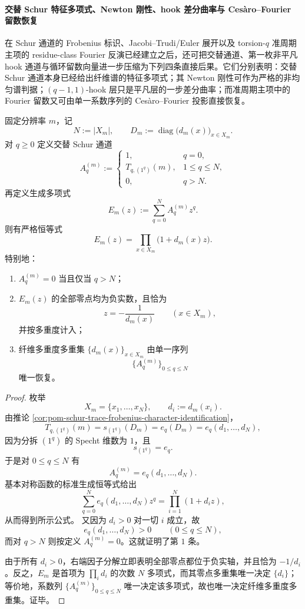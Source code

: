 \paragraph{交替 Schur 特征多项式、Newton 刚性、hook 差分曲率与 Ces\`aro--Fourier 留数恢复}
在 Schur 通道的 Frobenius 标识、Jacobi--Trudi/Euler 展开以及 torsion-\(q\) 准周期主项的 residue-class Fourier 反演已经建立之后，还可把交替通道、第一枚非平凡 hook 通道与循环留数向量进一步压缩为下列四条直接后果。它们分别表明：交替 Schur 通道本身已经给出纤维谱的特征多项式；其 Newton 刚性可作为严格的非均匀谱判据；\((q-1,1)\)-hook 层只是平凡层的一步差分曲率；而准周期主项中的 Fourier 留数又可由单一系数序列的 Ces\`aro--Fourier 投影直接恢复。

\begin{theorem}\label{thm:xi-time-part63a-alternating-schur-characteristic-polynomial}
固定分辨率 \(m\)，记
\[
N:=|X_m|,
\qquad
D_m:=\operatorname{diag}\bigl(d_m(x)\bigr)_{x\in X_m}.
\]
对 \(q\ge 0\) 定义交替 Schur 通道
\[
A_q^{(m)}:=
\begin{cases}
1, & q=0,\\[2pt]
T_{q,(1^q)}(m), & 1\le q\le N,\\[2pt]
0, & q>N.
\end{cases}
\]
再定义生成多项式
\[
E_m(z):=\sum_{q=0}^{N}A_q^{(m)}z^q.
\]
则有严格恒等式
\[
\boxed{\;
E_m(z)=\prod_{x\in X_m}\bigl(1+d_m(x)z\bigr).\;}
\]
特别地：
\begin{enumerate}
  \item \(A_q^{(m)}=0\) 当且仅当 \(q>N\)；
  \item \(E_m(z)\) 的全部零点均为负实数，且恰为
  \[
  z=-\frac{1}{d_m(x)}
  \qquad (x\in X_m),
  \]
  并按多重度计入；
  \item 纤维多重度多重集 \(\{d_m(x)\}_{x\in X_m}\) 由单一序列
  \[
  \{A_q^{(m)}\}_{0\le q\le N}
  \]
  唯一恢复。
\end{enumerate}
\end{theorem}
\begin{proof}
枚举
\[
X_m=\{x_1,\dots,x_N\},
\qquad
d_i:=d_m(x_i).
\]
由推论 \ref{cor:pom-schur-trace-frobenius-character-identification}，
\[
T_{q,(1^q)}(m)=s_{(1^q)}(D_m)=e_q(D_m)=e_q(d_1,\dots,d_N),
\]
因为分拆 \((1^q)\) 的 Specht 维数为 \(1\)，且
\[
s_{(1^q)}=e_q.
\]
于是对 \(0\le q\le N\) 有
\[
A_q^{(m)}=e_q(d_1,\dots,d_N).
\]
基本对称函数的标准生成恒等式给出
\[
\sum_{q=0}^{N}e_q(d_1,\dots,d_N)z^q
=
\prod_{i=1}^{N}(1+d_i z),
\]
从而得到所示公式。
又因为 \(d_i>0\) 对一切 \(i\) 成立，故
\[
e_q(d_1,\dots,d_N)>0
\qquad(0\le q\le N),
\]
而对 \(q>N\) 则按定义 \(A_q^{(m)}=0\)。这就证明了第 \(1\) 条。

由于所有 \(d_i>0\)，右端因子分解立即表明全部零点都位于负实轴，并且恰为 \(-1/d_i\)。反之，\(E_m\) 是首项为 \(\prod_i d_i\) 的次数 \(N\) 多项式，而其零点多重集唯一决定 \(\{d_i\}\)；等价地，系数列 \(\{A_q^{(m)}\}_{0\le q\le N}\) 唯一决定该多项式，故也唯一决定纤维多重度多重集。证毕。
\end{proof}

